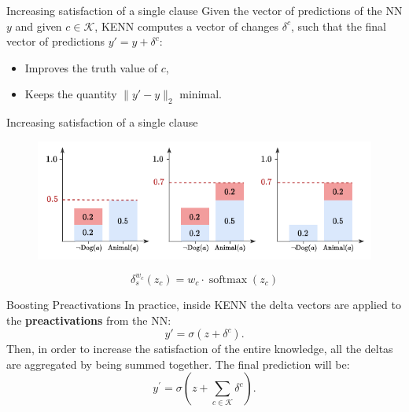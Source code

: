 \documentclass{beamer}
\begin{document}
\begin{frame}{Increasing satisfaction of a single clause}
	Given the vector of predictions of the NN $y$ and given $c\in \mathcal{K}$, KENN computes a vector of changes $\delta^c$, such that the final vector of predictions $y' = y +\delta^c$:
	\begin{itemize}
		\item Improves the truth value of $c$,
		\item Keeps the quantity $\|y'-y \|_2$ minimal.
	\end{itemize}
\end{frame}

\begin{frame}{Increasing satisfaction of a single clause}
	\begin{figure}
		\includegraphics[width=\linewidth]{images/boost_options.pdf}
	\end{figure}
\pause
	\begin{equation*}
	\delta_{s}^{w_{c}}\left(z_{c}\right)=w_{c} \cdot \operatorname{softmax}\left(z_{c}\right)
	\end{equation*}
\end{frame}


\begin{frame}{Boosting Preactivations}
	In practice, inside KENN the delta vectors are applied to the \textbf{preactivations} from the NN:
	\begin{equation*}
	y'=\sigma(z + \delta^c).
	\end{equation*}
	\pause
	Then, in order to increase the satisfaction of the entire knowledge, all the deltas are aggregated by being summed together. The final prediction will be:
	\begin{equation*}
	y^{\prime}=\sigma\left(z+\sum_{c \in \mathcal{K}} \delta^{c}\right).
	\end{equation*}
\end{frame}
\end{document}
